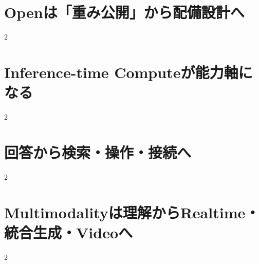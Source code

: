 \documentclass[lualatex,a4paper,11pt]{jlreq}
\begin{document}
\surveycover
\clearpage


\clearpage
\section{Openは「重み公開」から配備設計へ}
\label{pkg:open-deployment}
\vspace{0.15em}

\vspace{0.20em}
\begin{multicols}{2}

\end{multicols}

\medskip


\Needspace{0.45\textheight}
\bigskip
\section{Inference-time Computeが能力軸になる}
\label{pkg:reasoning}
\vspace{0.15em}

\vspace{0.20em}
\begin{multicols}{2}

\end{multicols}

\medskip


\Needspace{0.45\textheight}
\bigskip
\section{回答から検索・操作・接続へ}
\label{pkg:action-connectivity}
\vspace{0.15em}

\vspace{0.20em}
\begin{multicols}{2}

\end{multicols}

\medskip


\Needspace{0.45\textheight}
\bigskip
\section{Multimodalityは理解からRealtime・統合生成・Videoへ}
\label{pkg:multimodal-media}
\vspace{0.15em}

\vspace{0.20em}
\begin{multicols}{2}

\end{multicols}

\medskip

\end{document}

